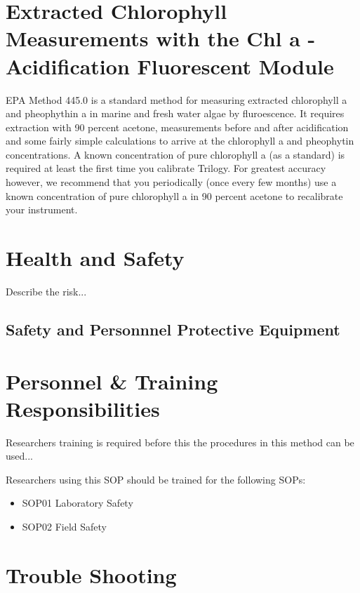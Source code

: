\documentclass[12pt]{../SOP3_beta}
\begin{document}
\section{Extracted Chlorophyll Measurements with the Chl a -Acidification Fluorescent Module}
\NP EPA Method 445.0 is a standard method for measuring extracted chlorophyll a and pheophythin a in marine and fresh water algae by fluroescence. It requires extraction with 90 percent acetone, measurements before and after acidification and some fairly simple calculations to arrive at the chlorophyll a and pheophytin concentrations.
\NP A known concentration of pure chlorophyll a (as a standard) is required at least the first time you calibrate Trilogy. For greatest accuracy however, we recommend that you periodically (once every few months) use a known concentration of pure chlorophyll a in 90 percent acetone to recalibrate your instrument. 
\section{Health and Safety}

\NP Describe the risk...


\subsection{Safety and Personnnel Protective Equipment}


\section{Personnel \& Training Responsibilities}

\NP Researchers training is required before this the procedures in this method can be used... 

\NP Researchers using this SOP should be trained for the following SOPs:

\begin{itemize}
  \item SOP01 Laboratory Safety
  \item SOP02 Field Safety
\end{itemize}

\section{Trouble Shooting}
\end{document}
